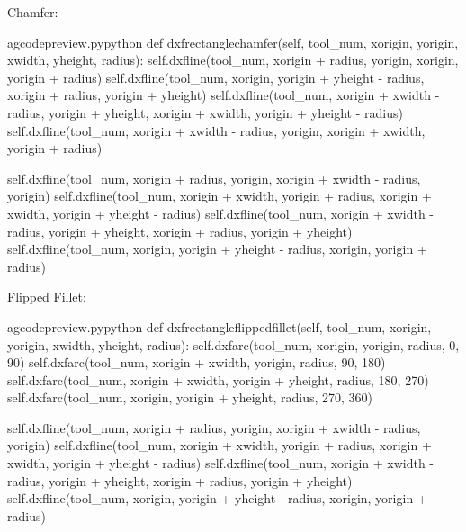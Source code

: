 \documentclass{ltxdoc}
\begin{document}
Chamfer:

\lstset{firstnumber=\thegcpy}
\begin{writecode}{a}{gcodepreview.py}{python}
    def dxfrectanglechamfer(self, tool_num, xorigin, yorigin, xwidth, yheight, radius):
        self.dxfline(tool_num, xorigin + radius, yorigin, xorigin, yorigin + radius)
        self.dxfline(tool_num, xorigin, yorigin + yheight - radius, xorigin + radius, yorigin + yheight)
        self.dxfline(tool_num, xorigin + xwidth - radius, yorigin + yheight, xorigin + xwidth, yorigin + yheight - radius)
        self.dxfline(tool_num, xorigin + xwidth - radius, yorigin, xorigin + xwidth, yorigin + radius)

        self.dxfline(tool_num, xorigin + radius, yorigin, xorigin + xwidth - radius, yorigin)
        self.dxfline(tool_num, xorigin + xwidth, yorigin + radius, xorigin + xwidth, yorigin + yheight - radius)
        self.dxfline(tool_num, xorigin + xwidth - radius, yorigin + yheight, xorigin + radius, yorigin + yheight)
        self.dxfline(tool_num, xorigin, yorigin + yheight - radius, xorigin, yorigin + radius)

\end{writecode}
\addtocounter{gcpy}{11}

Flipped Fillet:

\lstset{firstnumber=\thegcpy}
\begin{writecode}{a}{gcodepreview.py}{python}
    def dxfrectangleflippedfillet(self, tool_num, xorigin, yorigin, xwidth, yheight, radius):
        self.dxfarc(tool_num, xorigin, yorigin, radius,  0, 90)
        self.dxfarc(tool_num, xorigin + xwidth, yorigin, radius, 90, 180)
        self.dxfarc(tool_num, xorigin + xwidth, yorigin + yheight, radius, 180, 270)
        self.dxfarc(tool_num, xorigin, yorigin + yheight, radius, 270, 360)

        self.dxfline(tool_num, xorigin + radius, yorigin, xorigin + xwidth - radius, yorigin)
        self.dxfline(tool_num, xorigin + xwidth, yorigin + radius, xorigin + xwidth, yorigin + yheight - radius)
        self.dxfline(tool_num, xorigin + xwidth - radius, yorigin + yheight, xorigin + radius, yorigin + yheight)
        self.dxfline(tool_num, xorigin, yorigin + yheight - radius, xorigin, yorigin + radius)

\end{writecode}
\addtocounter{gcpy}{11}
\end{document}

